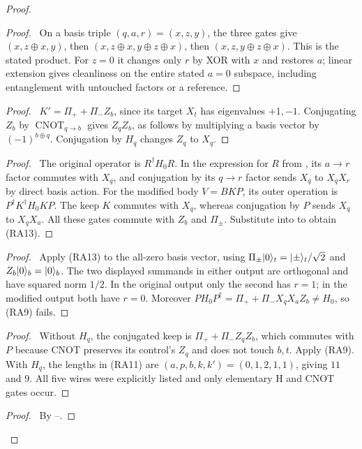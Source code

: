 \begin{proof}
 \begin{proof}\pf\ On a basis triple $(q,a,r)=(x,z,y)$, the three
 gates give $(x,z\oplus x,y)$, then
 $(x,z\oplus x,y\oplus z\oplus x)$, then
 $(x,z,y\oplus z\oplus x)$. This is the stated product.
 For $z=0$ it changes only $r$ by XOR with $x$ and restores $a$;
 linear extension gives cleanliness on the entire stated $a=0$
 subspace, including entanglement with untouched factors or a reference.
 \end{proof}
 \begin{proof}\pf\ $K'=\Pi_++\Pi_-Z_b$, since its target $X_t$
 has eigenvalues $+1,-1$. Conjugating $Z_b$ by
 $\operatorname{CNOT}_{q\to b}$ gives $Z_qZ_b$, as follows by
 multiplying a basis vector by $(-1)^{b\oplus q}$.
 Conjugation by $H_q$ changes $Z_q$ to $X_q$.\end{proof}
 \begin{proof}\pf\ The original operator is $R^\dagger H_0R$.
 In the expression for $R$ from , its
 $a\to r$ factor commutes with $X_q$, and conjugation by its
 $q\to r$ factor sends $X_q$ to $X_qX_r$ by direct basis action.
 For the modified body $V=BKP$, its outer operation is
 $P^\dagger K^\dagger H_0KP$. The keep $K$ commutes with $X_q$,
 whereas conjugation by $P$ sends $X_q$ to $X_qX_a$. All these
 gates commute with $Z_b$ and $\Pi_\pm$. Substitute into
  to obtain (RA13).\end{proof}
 \begin{proof}\pf\ Apply (RA13) to the all-zero basis vector, using
 $\Pi_\pm\lvert 0\rangle_t=\lvert \pm\rangle_t/\sqrt2$ and $Z_b\lvert 0\rangle_b=\lvert 0\rangle_b$.
 The two displayed summands in either output are orthogonal and have
 squared norm $1/2$. In the original output only the second has
 $r=1$; in the modified output both have $r=0$.
 Moreover $PH_0P^\dagger=\Pi_++\Pi_-X_qX_aZ_b\ne H_0$,
 so (RA9) fails.\end{proof}
 \begin{proof}\pf\ Without $H_q$, the conjugated keep is
 $\Pi_++\Pi_-Z_qZ_b$, which commutes with $P$ because CNOT
 preserves its control's $Z_q$ and does not touch $b,t$.
 Apply (RA9). With $H_q$, the lengths in (RA11) are
 $(a,p,b,k,k')=(0,1,2,1,1)$, giving $11$ and $9$.
 All five wires were explicitly listed and only elementary H and
 CNOT gates occur.\end{proof}
 \qedstep
 \begin{proof}\pf\ By --.
 \end{proof}
\end{proof}

